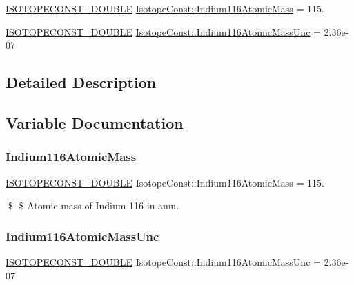 \begin{DoxyCompactItemize}
\item 
\mbox{\hyperlink{group___isotope_const-_macros_ga8f45a7272ce02c0b4c65c44636ed719a}{I\+S\+O\+T\+O\+P\+E\+C\+O\+N\+S\+T\+\_\+\+D\+O\+U\+B\+LE}} \mbox{\hyperlink{group___isotope_const-_indium-_in116_ga53833aacbca0854b02b17abc3355893c}{Isotope\+Const\+::\+Indium116\+Atomic\+Mass}} = 115.
\item 
\mbox{\hyperlink{group___isotope_const-_macros_ga8f45a7272ce02c0b4c65c44636ed719a}{I\+S\+O\+T\+O\+P\+E\+C\+O\+N\+S\+T\+\_\+\+D\+O\+U\+B\+LE}} \mbox{\hyperlink{group___isotope_const-_indium-_in116_ga5243410ea3f66528d0d11ac4153de8e3}{Isotope\+Const\+::\+Indium116\+Atomic\+Mass\+Unc}} = 2.\+36e-\/07
\end{DoxyCompactItemize}


\subsection{Detailed Description}


\subsection{Variable Documentation}
\mbox{\label{group___isotope_const-_indium-_in116_ga53833aacbca0854b02b17abc3355893c}} 
\subsubsection{\texorpdfstring{Indium116\+Atomic\+Mass}{Indium116AtomicMass}}
{\footnotesize\ttfamily \mbox{\hyperlink{group___isotope_const-_macros_ga8f45a7272ce02c0b4c65c44636ed719a}{I\+S\+O\+T\+O\+P\+E\+C\+O\+N\+S\+T\+\_\+\+D\+O\+U\+B\+LE}} Isotope\+Const\+::\+Indium116\+Atomic\+Mass = 115.}

\$ \$ Atomic mass of Indium-\/116 in amu. \mbox{\label{group___isotope_const-_indium-_in116_ga5243410ea3f66528d0d11ac4153de8e3}} 
\subsubsection{\texorpdfstring{Indium116\+Atomic\+Mass\+Unc}{Indium116AtomicMassUnc}}
{\footnotesize\ttfamily \mbox{\hyperlink{group___isotope_const-_macros_ga8f45a7272ce02c0b4c65c44636ed719a}{I\+S\+O\+T\+O\+P\+E\+C\+O\+N\+S\+T\+\_\+\+D\+O\+U\+B\+LE}} Isotope\+Const\+::\+Indium116\+Atomic\+Mass\+Unc = 2.\+36e-\/07}

